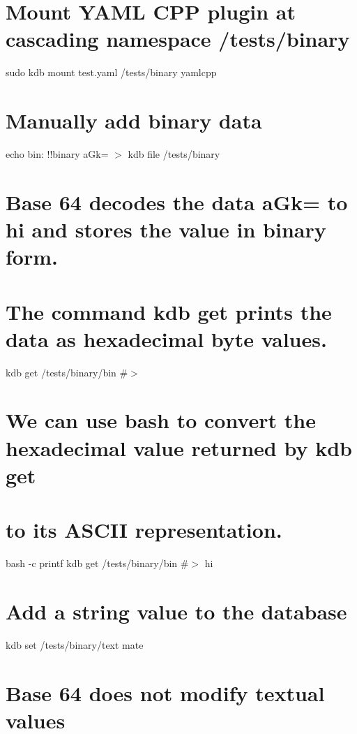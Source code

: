  \section*{Mount Y\+A\+ML C\+PP plugin at cascading namespace {\ttfamily /tests/binary}}

sudo kdb mount test.\+yaml /tests/binary yamlcpp \section*{Manually add binary data}

echo \textquotesingle{}bin\+: !!binary a\+Gk=\textquotesingle{} $>$ {\ttfamily kdb file /tests/binary}

\section*{Base 64 decodes the data {\ttfamily a\+Gk=} to {\ttfamily hi} and stores the value in binary form.}

\section*{The command {\ttfamily kdb get} prints the data as hexadecimal byte values.}

kdb get /tests/binary/bin \#$>$ 

\section*{We can use {\ttfamily bash} to convert the hexadecimal value returned by {\ttfamily kdb get}}

\section*{to its A\+S\+C\+II representation.}

bash -\/c \textquotesingle{}printf {\ttfamily kdb get /tests/binary/bin}\textquotesingle{} \#$>$ hi

\section*{Add a string value to the database}

kdb set /tests/binary/text mate \section*{Base 64 does not modify textual values}

